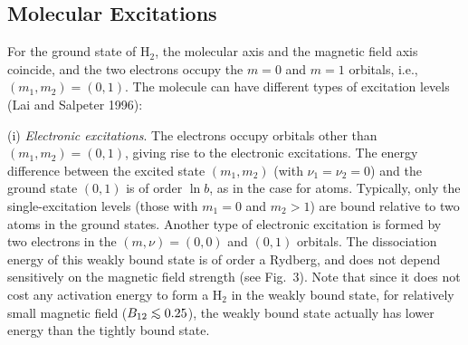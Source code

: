 \subsection{Molecular Excitations}

For the ground state of H$_2$, the molecular axis and the magnetic field 
axis coincide, and the two electrons occupy the $m=0$ and $m=1$ orbitals, 
i.e., $(m_1,m_2)=(0,1)$. The molecule can have different types of 
excitation levels (Lai and Salpeter 1996):

(i) {\it Electronic excitations}.
The electrons occupy orbitals other than $(m_1,m_2)=(0,1)$, 
giving rise to the electronic excitations. The energy difference 
between the excited state $(m_1,m_2)$ (with $\nu_1=\nu_2=0$) 
and the ground state $(0,1)$ is of order $\ln b$, 
as in the case for atoms. Typically, only the single-excitation levels 
(those with $m_1=0$ and $m_2>1$) are bound relative to two atoms in the 
ground states. Another type of electronic excitation is formed by two electrons
in the $(m,\nu)=(0,0)$ and $(0,1)$ orbitals.  The dissociation energy of
this weakly bound state is of order a Rydberg, and does not depend
sensitively on the magnetic field strength (see Fig.~3).
Note that since it does not cost any activation energy to form a H$_2$ in
the weakly bound state, for relatively small magnetic field
($B_{12}\lo 0.25$), the weakly bound
state actually has lower energy than the tightly bound state.

